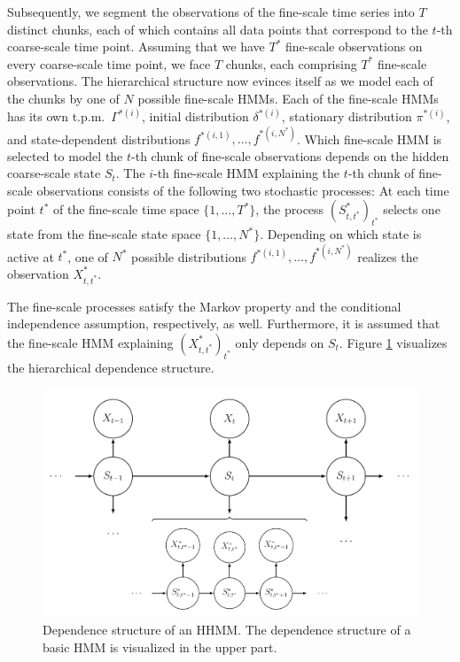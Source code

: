 \documentclass[article]{jss}
\begin{document}
Subsequently, we segment the observations of the fine-scale time series into $T$ distinct chunks, each of which contains all data points that correspond to the $t$-th coarse-scale time point. Assuming that we have $T^*$ fine-scale observations on every coarse-scale time point, we face $T$ chunks, each comprising $T^*$ fine-scale observations. The hierarchical structure now evinces itself as we model each of the chunks by one of $N$ possible fine-scale HMMs. Each of the fine-scale HMMs has its own t.p.m.\ $\Gamma^{*(i)}$, initial distribution $\delta^{*(i)}$, stationary distribution $\pi^{*(i)}$, and state-dependent distributions $f^{*(i,1)},\dots,f^{*(i,N^*)}$. Which fine-scale HMM is selected to model the $t$-th chunk of fine-scale observations depends on the hidden coarse-scale state $S_t$. The $i$-th fine-scale HMM explaining the $t$-th chunk of fine-scale observations consists of the following two stochastic processes: At each time point $t^*$ of the fine-scale time space $\{1,\dots,T^*\}$, the process $(S^*_{t,t^*})_{t^*}$ selects one state from the fine-scale state space $\{1,\dots,N^*\}$. Depending on which state is active at $t^*$, one of $N^*$ possible distributions $f^{*(i,1)},\dots,f^{*(i,N^*)}$ realizes the observation $X^*_{t,t^*}$. 

The fine-scale processes satisfy the Markov property and the conditional independence assumption, respectively, as well. Furthermore, it is assumed that the fine-scale HMM explaining $(X^*_{t,t^*})_{t^*}$ only depends on $S_t$. Figure \ref{fig:hhmm} visualizes the hierarchical dependence structure.

\begin{figure}
  \centering
  \includegraphics{hhmm.png}
  \caption{Dependence structure of an HHMM. The dependence structure of a basic HMM is visualized in the upper part.}
  \label{fig:hhmm}
\end{figure}
\end{document}
